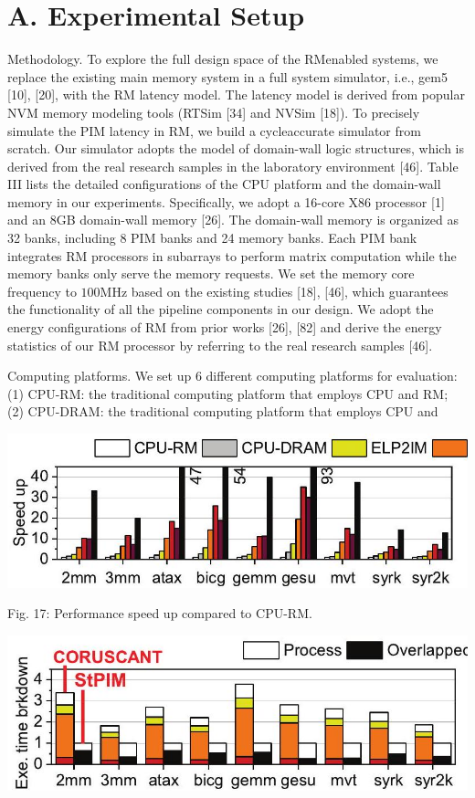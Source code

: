 \documentclass[10pt]{article}
\begin{document}
\section*{A. Experimental Setup}
Methodology. To explore the full design space of the RMenabled systems, we replace the existing main memory system in a full system simulator, i.e., gem5 [10], [20], with the RM latency model. The latency model is derived from popular NVM memory modeling tools (RTSim [34] and NVSim [18]). To precisely simulate the PIM latency in RM, we build a cycleaccurate simulator from scratch. Our simulator adopts the model of domain-wall logic structures, which is derived from the real research samples in the laboratory environment [46]. Table III lists the detailed configurations of the CPU platform and the domain-wall memory in our experiments. Specifically, we adopt a 16-core X86 processor [1] and an 8GB domain-wall memory [26]. The domain-wall memory is organized as 32 banks, including 8 PIM banks and 24 memory banks. Each PIM bank integrates RM processors in subarrays to perform matrix computation while the memory banks only serve the memory requests. We set the memory core frequency to $100 \mathrm{MHz}$ based on the existing studies [18], [46], which guarantees the functionality of all the pipeline components in our design. We adopt the energy configurations of RM from prior works [26], [82] and derive the energy statistics of our RM processor by referring to the real research samples [46].

Computing platforms. We set up 6 different computing platforms for evaluation: (1) CPU-RM: the traditional computing platform that employs CPU and RM; (2) CPU-DRAM: the traditional computing platform that employs CPU and

\begin{center}
\includegraphics[max width=\textwidth]{2024_05_12_abeba8a85da5b5ec4c7bg-10(1)}
\end{center}

Fig. 17: Performance speed up compared to CPU-RM.

\begin{center}
\includegraphics[max width=\textwidth]{2024_05_12_abeba8a85da5b5ec4c7bg-10(3)}
\end{center}
\end{document}
